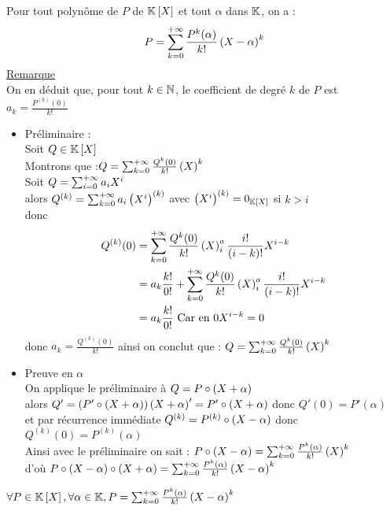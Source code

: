 \begin{defprop}
    Pour tout polynôme de \(P\) de \(\mathbb{K} \left[X\right]\) et tout \(\alpha\) dans \(\mathbb{K}\), on a : 
    \[P = \sum_{k=0}^{+\infty} \frac{P ^{k}(\alpha)}{k!}\left(X- \alpha\right)^k\]
    \underline{Remarque}\\
    On en déduit que, pour tout \(k \in \mathbb{N}\), le coefficient de degré \(k\) de \(P\) est \(a_k = \frac{P^{(k)}(0)}{k!}\)
\end{defprop}

\begin{dem}
    \begin{itemize}
        \item Préliminaire : \\
        Soit \(Q \in \mathbb{K} \left[X\right]\) \\
        Montrons que :\(Q = \sum_{k=0}^{+\infty} \frac{Q ^{k}(0)}{k!}\left(X\right)^k\)\\
        Soit \(Q = \sum_{i=0}^{+\infty} a_i X^i\) \\
        alors \(Q^{(k)} = \sum_{k=0}^{+\infty} a_i \left(X^i\right)^{(k)}\) avec \(\left(X^i\right)^{(k)} = 0_{\mathbb{K} \left[X\right]}\) si \(k>i\)\\
        donc \begin{align*}
            Q^{(k)}(0) &= \sum_{k=0}^{\pinf} \frac{Q ^{k}(0)}{k!}\paren{X}^a_i \frac{i!}{(i-k)!} X^{i-k} \\
            &= a_k \frac{k!}{0!} +  \sum_{k=0}^{\pinf} \frac{Q ^{k}(0)}{k!}\paren{X}^a_i \frac{i!}{(i-k)!} X^{i-k} \\
            & = a_k \frac{k!}{0!}  \hfill \text{ Car en 0} X^{i-k} = 0
        \end{align*}
        donc \(a_k =  \frac{Q^{(k)}(0)}{k!}\) ainsi on conclut que : \(Q = \sum_{k=0}^{+\infty} \frac{Q ^{k}(0)}{k!}\left(X\right)^k\)
        \item Preuve en \(\alpha\)\\
        On applique le préliminaire à \(Q = P \circ \left(X+\alpha\right)\)\\
        alors \(Q' = \left(P' \circ \left(X + \alpha\right)\right)\left(X+\alpha\right)' =P' \circ \left(X + \alpha\right) \) donc \(Q'(0) = P'(\alpha)\)\\
        et par récurrence immédiate \(Q^{(k)} = P^{(k)}\circ \left(X-\alpha\right)\)  donc \(Q^{(k)}(0) = P^{(k)}(\alpha)\)\\
        Ainsi avec le préliminaire on sait  : \(P \circ \left(X-\alpha\right) = \sum_{k=0}^{+\infty} \frac{P ^{k}(\alpha)}{k!}\left(X\right)^k\) \\
        d'où \(P \circ \left(X-\alpha\right) \circ \left(X + \alpha\right) = \sum_{k=0}^{+\infty} \frac{P ^{k}(\alpha)}{k!}\left(X-\alpha\right)^k\)
    \end{itemize}
    \conclusion \(\forall P \in \mathbb{K} \left[X\right], \forall \alpha \in \mathbb{K} ,P = \sum_{k=0}^{+\infty} \frac{P ^{k}(\alpha)}{k!}\left(X- \alpha\right)^k\)
\end{dem}

